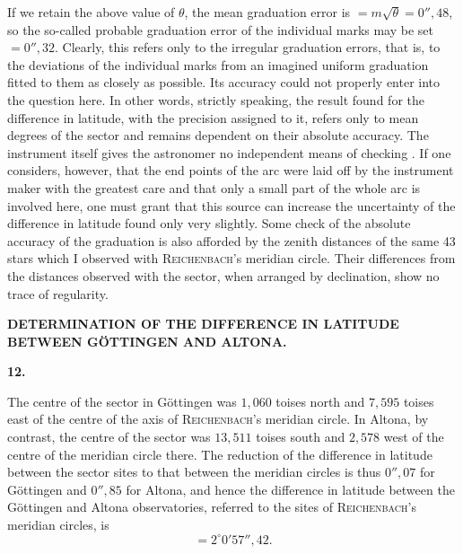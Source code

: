 If we retain the above value of \(\theta\), the mean graduation error is
\(=m\surd\theta=0''{,}48\), so the so-called probable graduation error
of the individual marks may be set \(=0''{,}32\). Clearly, this refers
only to the irregular graduation errors, that is, to the deviations of
the individual marks from an imagined uniform graduation fitted to
them as closely as possible. Its
 accuracy could not properly enter into the question here.
In other words, strictly speaking, the result found for the difference in
latitude, with the precision assigned to it, refers only to mean degrees of
the sector and remains dependent on their absolute accuracy.
The instrument itself gives the astronomer no independent means of
checking . If one considers, however, that the end points of the arc
were laid off by the instrument maker with the greatest care and that only
a small part of the whole arc is involved here, one must grant that this
source can increase the uncertainty of the difference in latitude found
only very slightly. Some check of the absolute accuracy of the graduation
is also afforded by the zenith distances of the same
43 stars which I observed with \textsc{Reichenbach}'s meridian circle.
Their differences from the distances observed with the sector,
when arranged by declination,
show no trace of regularity.

\par\clearpage
\noindent{}\parbox[t]{\dimexpr\linewidth-24mm\relax}{\centering\scriptsize\bfseries DETERMINATION OF THE DIFFERENCE IN LATITUDE BETWEEN GÖTTINGEN AND ALTONA.}\makebox[12mm][r]{}\par\medskip

\begin{center}\textbf{12.}\end{center}

The centre of the sector in Göttingen was \(1{,}060\) toises north
and \(7{,}595\) toises east of the centre of the axis of \textsc{Reichenbach}'s
meridian circle. In Altona, by contrast, the centre of the sector was \(13{,}511\)
toises south and \(2{,}578\) west of the centre of the meridian circle there.
The reduction of the difference in latitude between the sector sites to that between
the meridian circles is thus \(0''{,}07\) for Göttingen and \(0''{,}85\) for Altona, and hence
the difference in latitude between the Göttingen and Altona observatories,
referred to the sites of \textsc{Reichenbach}'s meridian circles, is
\[
=2^\circ0'57''{,}42.
\]

